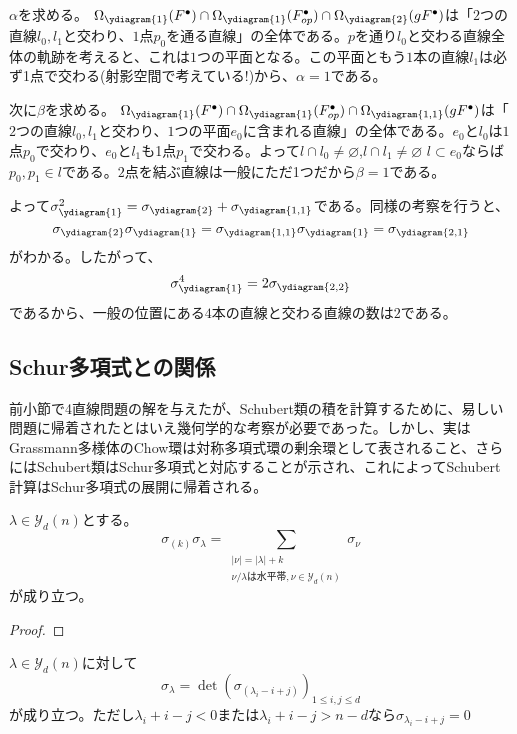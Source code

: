 \documentclass{ltjsreport}
\begin{document}
\begin{eg}
  $\alpha$を求める。
  $\Omega_{\ydiagram{1}}(F^\bullet)\cap
  \Omega_{\ydiagram{1}}(F^\bullet_{op})\cap
  \Omega_{\ydiagram{2}}(gF^\bullet)$は「$2$つの直線$l_0,l_1$と交わり、$1$点$p_0$を通る直線」の全体である。$p$を通り$l_0$と交わる直線全体の軌跡を考えると、これは$1$つの平面となる。この平面ともう$1$本の直線$l_1$は必ず1点で交わる(射影空間で考えている!)から、$\alpha=1$である。

  次に$\beta$を求める。
  $\Omega_{\ydiagram{1}}(F^\bullet)\cap
  \Omega_{\ydiagram{1}}(F^\bullet_{op})\cap
  \Omega_{\ydiagram{1,1}}(gF^\bullet)$は「$2$つの直線$l_0,l_1$と交わり、$1$つの平面$e_0$に含まれる直線」の全体である。$e_0$と$l_0$は$1$点$p_0$で交わり、$e_0$と$l_1$も1点$p_1$で交わる。よって$l\cap l_0\neq\varnothing$,$l\cap l_1\neq\varnothing$ $l\subset e_0$ならば$p_0,p_1\in l$である。$2$点を結ぶ直線は一般にただ1つだから$\beta=1$である。

  よって$\sigma_{\ydiagram{1}}^2=\sigma_{\ydiagram{2}}+\sigma_{\ydiagram{1,1}}$である。同様の考察を行うと、
  \[
  \sigma_{\ydiagram{2}}\sigma_{\ydiagram{1}}=\sigma_{\ydiagram{1,1}}\sigma_{\ydiagram{1}}=\sigma_{\ydiagram{2,1}}  
  \]
  がわかる。したがって、
  \[
  \sigma_{\ydiagram{1}}^4=2\sigma_{\ydiagram{2,2}}  
  \]
  であるから、一般の位置にある$4$本の直線と交わる直線の数は$2$である。
\end{eg}


\subsection{Schur多項式との関係}

前小節で4直線問題の解を与えたが、Schubert類の積を計算するために、易しい問題に帰着されたとはいえ幾何学的な考察が必要であった。しかし、実はGrassmann多様体のChow環は対称多項式環の剰余環として表されること、さらにはSchubert類はSchur多項式と対応することが示され、これによってSchubert計算はSchur多項式の展開に帰着される。


\begin{theo}[Pieriの規則]
  $\lambda\in\mathcal{Y}_d(n)$とする。
  \[
  \sigma_{(k)}\sigma_\lambda=\sum_{\substack{|\nu|=|\lambda|+k\\\nu/\lambda\text{は水平帯},\nu\in\mathcal{Y}_d(n)}}\sigma_\nu
  \]
  が成り立つ。
\end{theo}

\begin{proof}
  
\end{proof}

\begin{cor}[Giambelliの公式]\label{giambelli}
  $\lambda\in\mathcal{Y}_d(n)$に対して
    \[
    \sigma_\lambda
    =\det(\sigma_{(\lambda_{i}-i+j)})_{1\leq i,j\leq d}
    \]
    が成り立つ。ただし$\lambda_i+i-j<0$または$\lambda_i+i-j>n-d$なら$\sigma_{\lambda_i-i+j}=0$
\end{cor}
\end{document}
